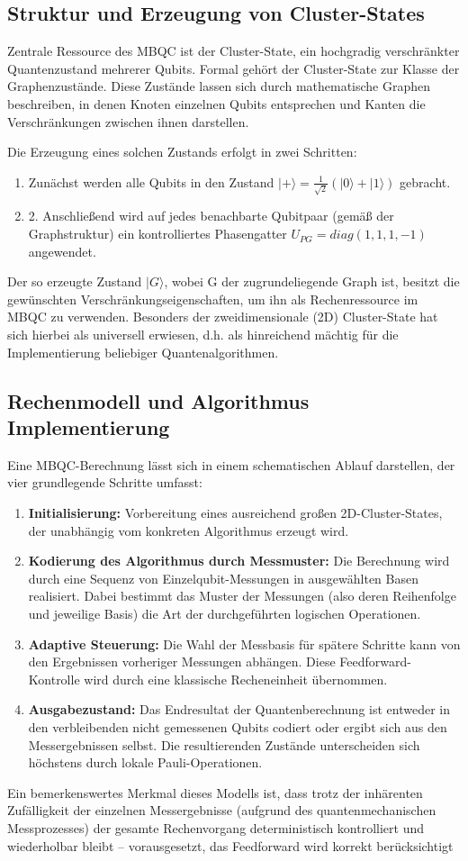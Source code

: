 \subsection*{Struktur und Erzeugung von Cluster-States}
Zentrale Ressource des MBQC ist der Cluster-State, ein hochgradig verschränkter Quantenzustand mehrerer Qubits. Formal gehört der Cluster-State zur Klasse der Graphenzustände. Diese Zustände lassen sich durch mathematische Graphen beschreiben, in denen Knoten einzelnen Qubits entsprechen und Kanten die Verschränkungen zwischen ihnen darstellen.

Die Erzeugung eines solchen Zustands erfolgt in zwei Schritten:
\begin{enumerate}
    \item 	Zunächst werden alle Qubits in den Zustand $|+\rangle = \frac{1}{\sqrt{2}}(|0\rangle + |1\rangle)$ gebracht.
    \item 2.	Anschließend wird auf jedes benachbarte Qubitpaar (gemäß der Graphstruktur) ein kontrolliertes Phasengatter $U_{PG}=diag(1,1,1,-1)$ angewendet.
\end{enumerate}
Der so erzeugte Zustand $|G\rangle$, wobei G der zugrundeliegende Graph ist, besitzt die gewünschten Verschränkungseigenschaften, um ihn als Rechenressource im MBQC zu verwenden. Besonders der zweidimensionale (2D) Cluster-State hat sich hierbei als universell erwiesen, d.h. als hinreichend mächtig für die Implementierung beliebiger Quantenalgorithmen.
\subsection*{Rechenmodell und Algorithmus Implementierung}
Eine MBQC-Berechnung lässt sich in einem schematischen Ablauf darstellen, der vier grundlegende Schritte umfasst:
\begin{enumerate}
    \item \textbf{Initialisierung:} Vorbereitung eines ausreichend großen 2D-Cluster-States, der unabhängig vom konkreten Algorithmus erzeugt wird.
    \item \textbf{Kodierung des Algorithmus durch Messmuster:} Die Berechnung wird durch eine Sequenz von Einzelqubit-Messungen in ausgewählten Basen realisiert. Dabei bestimmt das Muster der Messungen (also deren Reihenfolge und jeweilige Basis) die Art der durchgeführten logischen Operationen.
    \item \textbf{Adaptive Steuerung:} Die Wahl der Messbasis für spätere Schritte kann von den Ergebnissen vorheriger Messungen abhängen. Diese Feedforward-Kontrolle wird durch eine klassische Recheneinheit übernommen.
    \item \textbf{Ausgabezustand:} Das Endresultat der Quantenberechnung ist entweder in den verbleibenden nicht gemessenen Qubits codiert oder ergibt sich aus den Messergebnissen selbst. Die resultierenden Zustände unterscheiden sich höchstens durch lokale Pauli-Operationen.
\end{enumerate}
Ein bemerkenswertes Merkmal dieses Modells ist, dass trotz der inhärenten Zufälligkeit der einzelnen Messergebnisse (aufgrund des quantenmechanischen Messprozesses) der gesamte Rechenvorgang deterministisch kontrolliert und wiederholbar bleibt – vorausgesetzt, das Feedforward wird korrekt berücksichtigt 
